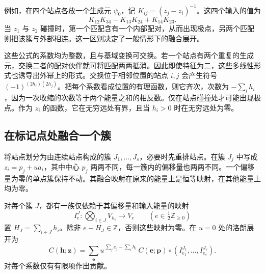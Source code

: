 例如，在四个站点各放一个生成元 $\psi_0$，记 $K_{ij}=(z_j-z_i)^{-1}$。这四个输入的值为
\[
 K_{12}K_{34}-K_{13}K_{24}+K_{14}K_{23}.
\]
当 $z_1$ 与 $z_2$ 碰撞时，第一个匹配含有一个内部配对，从而出现极点，另两个匹配则把该簇与外部相连。这一区别决定了一般情形下的融合展开。

这些公式的系数均为整数，且与基域变换可交换。若一个站点有两个重复的生成元，交换二者的配对伙伴就可将匹配两两抵消。因此即使特征为二，这些多线性形式也诱导出外幂上的形式。交换位于相邻位置的站点 $i,j$ 会产生符号 $(-1)^{(2h_i)(2h_j)}$。把每个系数看成位置的有理函数，则它齐次，次数为 $-\sum_i h_i$，因为一次收缩的次数等于两个能量之和的相反数。仅在站点碰撞处才可能出现极点。作为 $z_i$ 的函数，它在无穷远处有界，且当 $h_i>0$ 时在无穷远处为零。

\subsection{在标记点处融合一个簇}
将站点划分为由连续站点构成的簇 $J_1,\ldots,J_s$，必要时先重排站点。在簇 $J_j$ 中写成 $z_i=p_j+u a_i$，其中中心 $p_j$ 两两不同，每一簇内的偏移量也两两不同。一个偏移量为零的单点簇保持不动。其融合映射在原来的能量上是恒等映射，在其他能量上均为零。

\begin{proposition}[融合]\label{prop:fusion}
对每个簇 $J$，都有一族仅依赖于其偏移量和输入能量的映射
\[
 I_e^J:\bigotimes_{i\in J}V_{h_i}\longrightarrow V_e
 \qquad(e\in\tfrac12\mathbb Z_{\ge0})
\]
置 $H_J=\sum_{i\in J}h_i$。除非 $e-H_J\in\mathbb Z$，否则这些映射为零。在 $u=0$ 处的洛朗展开为
\begin{equation}\label{eq:fermions-fusion}
 C(\mathbf h;\mathbf z)
 =\sum_{\mathbf e}u^{\,\sum_j e_j-\sum_i h_i}\,
 C(\mathbf e;\mathbf p)\circ
       (I^{J_1}_{e_1},\ldots,I^{J_s}_{e_s}).
\end{equation}
对每个系数仅有有限项作出贡献。
\end{proposition}

